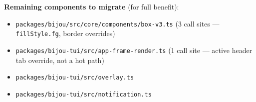 \textbf{Remaining components to migrate} (for full benefit):

\begin{itemize}
\tightlist
\item
  \texttt{p\allowbreak{}a\allowbreak{}c\allowbreak{}k\allowbreak{}a\allowbreak{}g\allowbreak{}e\allowbreak{}s\allowbreak{}/\allowbreak{}b\allowbreak{}i\allowbreak{}j\allowbreak{}o\allowbreak{}u\allowbreak{}/\allowbreak{}s\allowbreak{}r\allowbreak{}c\allowbreak{}/\allowbreak{}c\allowbreak{}o\allowbreak{}r\allowbreak{}e\allowbreak{}/\allowbreak{}c\allowbreak{}o\allowbreak{}m\allowbreak{}p\allowbreak{}o\allowbreak{}n\allowbreak{}e\allowbreak{}n\allowbreak{}t\allowbreak{}s\allowbreak{}/\allowbreak{}b\allowbreak{}o\allowbreak{}x\allowbreak{}-\allowbreak{}v\allowbreak{}3\allowbreak{}.\allowbreak{}t\allowbreak{}s} (3 call sites --- \texttt{f\allowbreak{}i\allowbreak{}l\allowbreak{}l\allowbreak{}S\allowbreak{}t\allowbreak{}y\allowbreak{}l\allowbreak{}e\allowbreak{}.\allowbreak{}f\allowbreak{}g}, border overrides)
\item
  \texttt{p\allowbreak{}a\allowbreak{}c\allowbreak{}k\allowbreak{}a\allowbreak{}g\allowbreak{}e\allowbreak{}s\allowbreak{}/\allowbreak{}b\allowbreak{}i\allowbreak{}j\allowbreak{}o\allowbreak{}u\allowbreak{}-\allowbreak{}t\allowbreak{}u\allowbreak{}i\allowbreak{}/\allowbreak{}s\allowbreak{}r\allowbreak{}c\allowbreak{}/\allowbreak{}a\allowbreak{}p\allowbreak{}p\allowbreak{}-\allowbreak{}f\allowbreak{}r\allowbreak{}a\allowbreak{}m\allowbreak{}e\allowbreak{}-\allowbreak{}r\allowbreak{}e\allowbreak{}n\allowbreak{}d\allowbreak{}e\allowbreak{}r\allowbreak{}.\allowbreak{}t\allowbreak{}s} (1 call site --- active header tab override, not a hot path)
\item
  \texttt{p\allowbreak{}a\allowbreak{}c\allowbreak{}k\allowbreak{}a\allowbreak{}g\allowbreak{}e\allowbreak{}s\allowbreak{}/\allowbreak{}b\allowbreak{}i\allowbreak{}j\allowbreak{}o\allowbreak{}u\allowbreak{}-\allowbreak{}t\allowbreak{}u\allowbreak{}i\allowbreak{}/\allowbreak{}s\allowbreak{}r\allowbreak{}c\allowbreak{}/\allowbreak{}o\allowbreak{}v\allowbreak{}e\allowbreak{}r\allowbreak{}l\allowbreak{}a\allowbreak{}y\allowbreak{}.\allowbreak{}t\allowbreak{}s}
\item
  \texttt{p\allowbreak{}a\allowbreak{}c\allowbreak{}k\allowbreak{}a\allowbreak{}g\allowbreak{}e\allowbreak{}s\allowbreak{}/\allowbreak{}b\allowbreak{}i\allowbreak{}j\allowbreak{}o\allowbreak{}u\allowbreak{}-\allowbreak{}t\allowbreak{}u\allowbreak{}i\allowbreak{}/\allowbreak{}s\allowbreak{}r\allowbreak{}c\allowbreak{}/\allowbreak{}n\allowbreak{}o\allowbreak{}t\allowbreak{}i\allowbreak{}f\allowbreak{}i\allowbreak{}c\allowbreak{}a\allowbreak{}t\allowbreak{}i\allowbreak{}o\allowbreak{}n\allowbreak{}.\allowbreak{}t\allowbreak{}s}

\end{itemize}
